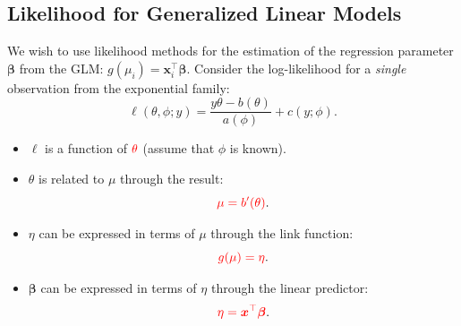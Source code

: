 \documentclass[oneside]{book}\usepackage[]{graphicx}\usepackage[svgnames]{xcolor}
\providecommand{\Vector}[1]{\bm{#1}}%
\begin{document}
\subsection*{Likelihood for Generalized Linear Models}
We wish to use likelihood methods for the estimation of the regression parameter $ \Vector{\beta} $ from the GLM: $ g(\mu_i)=\Vector{x}_i^\top \Vector{\beta} $.
Consider the log-likelihood for a \emph{single} observation from the exponential family:
\[ \ell(\theta,\phi;y)=\frac{y\theta-b(\theta)}{a(\phi)}+c(y;\phi). \]
\begin{itemize}
    \item $ \ell $ is a function of $ \textcolor{Red}{\theta} $ (assume that $ \phi $ is known).
    \item $ \theta $ is related to $ \mu $ through the result:
          \[ \textcolor{Red}{\mu=b^{\prime}(\theta)}. \]
    \item $ \eta $ can be expressed in terms of $ \mu $ through the link function:
          \[ \textcolor{Red}{g(\mu)=\eta}. \]
    \item $ \Vector{\beta} $ can be expressed in terms of $ \eta $ through the linear predictor:
          \[ \textcolor{Red}{\eta=\Vector{x}^\top \Vector{\beta}}. \]
\end{itemize}
\end{document}
